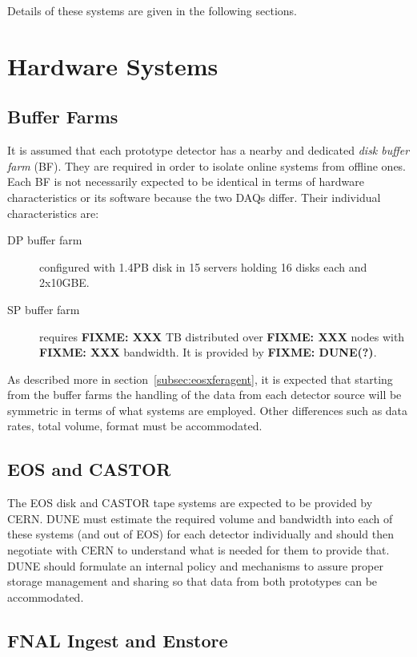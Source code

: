 \documentclass[pdftex,12pt,letter]{article}
\newcommand{\fixme}[1]{\textbf{FIXME: #1}}
\begin{document}
\noindent Details of these systems are given in the following sections.

\section{Hardware Systems}

\subsection{Buffer Farms}

It is assumed that each prototype detector has a nearby and dedicated
\textit{disk buffer farm} (BF).  They are required in order to isolate
online systems from offline ones.  Each BF is not necessarily expected
to be identical in terms of hardware characteristics or its software
because the two DAQs differ.  Their individual characteristics are:

\begin{description}
\item[DP buffer farm] configured with 1.4PB disk in 15 servers holding 16 disks each and 2x10GBE.~\cite{marteau}
\item[SP buffer farm] requires \fixme{XXX} TB distributed over
  \fixme{XXX} nodes with \fixme{XXX} bandwidth.  It is provided by
  \fixme{DUNE(?)}.
\end{description}

As described more in section~\ref{subsec:eosxferagent}, it is expected
that starting from the buffer farms the handling of the data from each
detector source will be symmetric in terms of what systems are
employed.  Other differences such as data rates, total volume, format
must be accommodated.

\subsection{EOS and CASTOR}

The EOS disk and CASTOR tape systems are expected to be provided by
CERN.  DUNE must estimate the required volume and bandwidth into each
of these systems (and out of EOS) for each detector individually and
should then negotiate with CERN to understand what is needed for them
to provide that.  DUNE should formulate an internal policy and
mechanisms to assure proper storage management and sharing so that
data from both prototypes can be accommodated.

\subsection{FNAL Ingest and Enstore}
\end{document}
